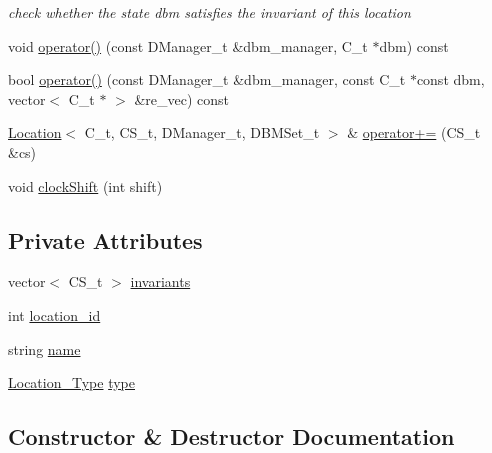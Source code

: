 \begin{DoxyCompactItemize}
\begin{DoxyCompactList}\small\item\em check whether the state dbm satisfies the invariant of this location \end{DoxyCompactList}\item 
void \mbox{\hyperlink{classgraphsat_1_1_location_acff10a7428288b8377a65c3377949160}{operator()}} (const D\+Manager\+\_\+t \&dbm\+\_\+manager, C\+\_\+t $\ast$dbm) const
\item 
bool \mbox{\hyperlink{classgraphsat_1_1_location_af10b55e77e449360de6b5ad8b1b30e44}{operator()}} (const D\+Manager\+\_\+t \&dbm\+\_\+manager, const C\+\_\+t $\ast$const dbm, vector$<$ C\+\_\+t $\ast$ $>$ \&re\+\_\+vec) const
\item 
\mbox{\hyperlink{classgraphsat_1_1_location}{Location}}$<$ C\+\_\+t, C\+S\+\_\+t, D\+Manager\+\_\+t, D\+B\+M\+Set\+\_\+t $>$ \& \mbox{\hyperlink{classgraphsat_1_1_location_a71a98b44e4364f888b495267e1c8903e}{operator+=}} (C\+S\+\_\+t \&cs)
\item 
void \mbox{\hyperlink{classgraphsat_1_1_location_a2205739de5231669ad78ffb75c0516b6}{clock\+Shift}} (int shift)
\end{DoxyCompactItemize}
\subsection*{Private Attributes}
\begin{DoxyCompactItemize}
\item 
vector$<$ C\+S\+\_\+t $>$ \mbox{\hyperlink{classgraphsat_1_1_location_ab142fcc5402ea982f34ad075fb24c583}{invariants}}
\item 
int \mbox{\hyperlink{classgraphsat_1_1_location_a4dcd1a37246191bbf2014e0884251b04}{location\+\_\+id}}
\item 
string \mbox{\hyperlink{classgraphsat_1_1_location_af72c40b3bc9335a7a6d8ebc0180bc1d6}{name}}
\item 
\mbox{\hyperlink{namespacegraphsat_a2ea948010388eb8178aa254a3b2023c9}{Location\+\_\+\+Type}} \mbox{\hyperlink{classgraphsat_1_1_location_acb7fb525e22f6d11b60fc876381e9b56}{type}}
\end{DoxyCompactItemize}


\subsection{Constructor \& Destructor Documentation}
\mbox{\label{classgraphsat_1_1_location_ac72074c9f67bbeed9762bd23f38112b1}} 
